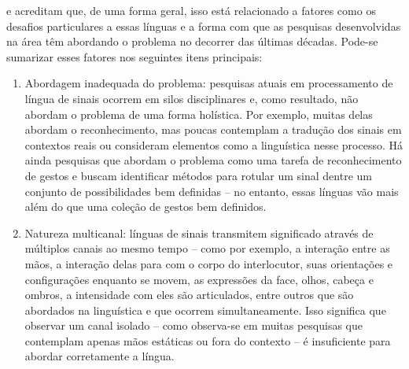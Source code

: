 

\citeauthor{bragg-2019-slr-interdisciplinary} e \citeauthor{cooper-2011-slr} acreditam que, de uma forma geral, isso está relacionado a fatores como os desafios particulares a essas línguas e a forma com que as pesquisas desenvolvidas na área têm abordando o problema no decorrer das últimas décadas.
Pode-se sumarizar esses fatores nos seguintes itens principais:

\begin{enumerate}
    \item Abordagem inadequada do problema: pesquisas atuais em processamento de língua de sinais ocorrem em silos disciplinares e, como resultado, não abordam o problema de uma forma holística. Por exemplo, muitas delas abordam o reconhecimento, mas poucas contemplam a tradução dos sinais em contextos reais ou consideram elementos como a linguística nesse processo.
    Há ainda pesquisas que abordam o problema como uma tarefa de reconhecimento de gestos e buscam identificar métodos para rotular um sinal dentre um conjunto de possibilidades bem definidas -- no entanto, essas línguas vão mais além do que uma coleção de gestos bem definidos.

    \item Natureza multicanal: línguas de sinais transmitem significado através de múltiplos canais ao mesmo tempo -- como por exemplo, a interação entre as mãos, a interação delas para com o corpo do interlocutor, suas orientações e configurações enquanto se movem, as expressões da face, olhos, cabeça e ombros, a intensidade com eles são articulados, entre outros que são abordados na linguística e que ocorrem simultaneamente.
    Isso significa que observar um canal isolado -- como observa-se em muitas pesquisas que contemplam apenas mãos estáticas ou fora do contexto -- é insuficiente para abordar corretamente a língua.
    

\end{enumerate}

